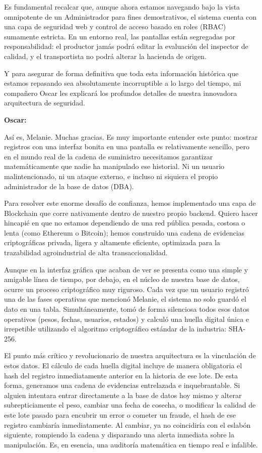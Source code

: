 \documentclass[12pt,a4paper]{article}
\begin{document}
Es fundamental recalcar que, aunque ahora estamos navegando bajo la vista omnipotente de un Administrador para fines demostrativos, el sistema cuenta con una capa de seguridad web y control de acceso basado en roles (RBAC) sumamente estricta. En un entorno real, las pantallas están segregadas por responsabilidad: el productor jamás podrá editar la evaluación del inspector de calidad, y el transportista no podrá alterar la hacienda de origen. 

Y para asegurar de forma definitiva que toda esta información histórica que estamos repasando sea absolutamente incorruptible a lo largo del tiempo, mi compañero Oscar les explicará los profundos detalles de nuestra innovadora arquitectura de seguridad.

\textbf{Oscar:}

Así es, Melanie. Muchas gracias. Es muy importante entender este punto: mostrar registros con una interfaz bonita en una pantalla es relativamente sencillo, pero en el mundo real de la cadena de suministro necesitamos garantizar matemáticamente que nadie ha manipulado ese historial. Ni un usuario malintencionado, ni un ataque externo, e incluso ni siquiera el propio administrador de la base de datos (DBA). 

Para resolver este enorme desafío de confianza, hemos implementado una capa de Blockchain que corre nativamente dentro de nuestro propio backend. Quiero hacer hincapié en que no estamos dependiendo de una red pública pesada, costosa o lenta (como Ethereum o Bitcoin); hemos construido una cadena de evidencias criptográficas privada, ligera y altamente eficiente, optimizada para la trazabilidad agroindustrial de alta transaccionalidad.

Aunque en la interfaz gráfica que acaban de ver se presenta como una simple y amigable línea de tiempo, por debajo, en el núcleo de nuestra base de datos, ocurre un proceso criptográfico muy riguroso. Cada vez que un usuario registró una de las fases operativas que mencionó Melanie, el sistema no solo guardó el dato en una tabla. Simultáneamente, tomó de forma silenciosa todos esos datos operativos (pesos, fechas, usuarios, estados) y calculó una huella digital única e irrepetible utilizando el algoritmo criptográfico estándar de la industria: SHA-256. 

El punto más crítico y revolucionario de nuestra arquitectura es la vinculación de estos datos. El cálculo de cada huella digital incluye de manera obligatoria el hash del registro inmediatamente anterior en la historia de ese lote. De esta forma, generamos una cadena de evidencias entrelazada e inquebrantable. Si alguien intentara entrar directamente a la base de datos hoy mismo y alterar subrepticiamente el peso, cambiar una fecha de cosecha, o modificar la calidad de este lote pasado para encubrir un error o cometer un fraude, el hash de ese registro cambiaría inmediatamente. Al cambiar, ya no coincidiría con el eslabón siguiente, rompiendo la cadena y disparando una alerta inmediata sobre la manipulación. Es, en esencia, una auditoría matemática en tiempo real e infalible.
\end{document}

